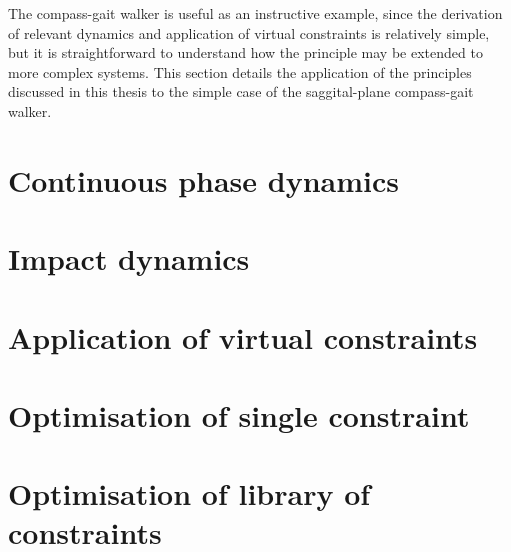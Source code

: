 The compass-gait walker is useful as an instructive example, since the derivation of relevant dynamics and application of virtual constraints is relatively simple, but it is straightforward to understand how the principle may be extended to more complex systems. This section details the application of the principles discussed in this thesis to the simple case of the saggital-plane compass-gait walker.

\section{Continuous phase dynamics}


\section{Impact dynamics}


\section{Application of virtual constraints}


\section{Optimisation of single constraint}


\section{Optimisation of library of constraints}
